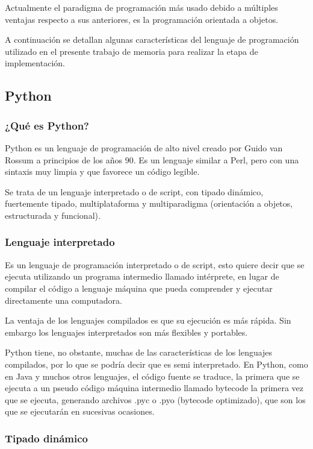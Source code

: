 \documentclass[12pt,legalpaper]{report}
\begin{document}
Actualmente el paradigma de programación más usado debido a múltiples ventajas respecto a sus anteriores, es la programación orientada a objetos.

A continuación se detallan algunas características del lenguaje de programación utilizado en el presente trabajo de memoria para realizar la etapa de implementación.

		\subsection{Python}

			\subsubsection{¿Qué es Python?}

Python es un lenguaje de programación de alto nivel creado por Guido van Rossum a principios de los años 90.  Es un lenguaje similar a Perl, pero con una sintaxis muy limpia y que favorece un código legible.

Se trata de un lenguaje interpretado o de script, con tipado dinámico, fuertemente tipado, multiplataforma y multiparadigma (orientación a objetos, estructurada y funcional).

			\subsubsection{Lenguaje interpretado}

Es un lenguaje de programación interpretado o de script, esto quiere decir que se ejecuta utilizando un programa intermedio llamado intérprete, en lugar de compilar el código a lenguaje máquina que pueda comprender y ejecutar directamente una computadora.

La ventaja de los lenguajes compilados es que su ejecución es más rápida. Sin embargo los lenguajes interpretados son más flexibles y portables.

Python tiene, no obstante, muchas de las características de los lenguajes compilados, por lo que se podría decir que es semi interpretado. En Python, como en Java y muchos otros lenguajes, el código fuente se traduce, la primera que se ejecuta a un pseudo código máquina intermedio llamado bytecode la primera vez que se ejecuta, generando archivos .pyc o .pyo (bytecode optimizado), que son los que se ejecutarán en sucesivas ocasiones.


			\subsubsection{Tipado dinámico}
\end{document}
